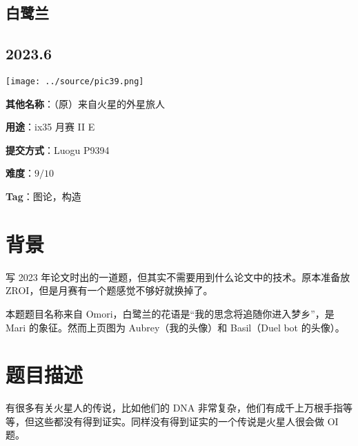 \documentclass[a4paper,10pt]{article}
\begin{document}
\vspace*{\fill}
\begin{center}

\section{白鹭兰}

\subsection*{2023.6}

\vspace{10pt}

\texttt{[image: ../source/pic39.png]}

\vspace{10pt}

\textbf{其他名称}：（原）来自火星的外星旅人

\vspace{10pt}

\textbf{用途}：ix35 月赛 II E

\vspace{10pt}

\textbf{提交方式}：Luogu P9394

\vspace{10pt}

\textbf{难度}：$9/10$

\vspace{10pt}

\textbf{Tag}：图论，构造

\end{center}
\vspace*{\fill}

\newpage

\section*{背景}

写 2023 年论文时出的一道题，但其实不需要用到什么论文中的技术。原本准备放 ZROI，但是月赛有一个题感觉不够好就换掉了。

本题题目名称来自 Omori，白鹭兰的花语是“我的思念将追随你进入梦乡”，是 Mari 的象征。然而上页图为 Aubrey（我的头像）和 Basil（Duel bot 的头像）。

\section*{题目描述}

有很多有关火星人的传说，比如他们的 DNA 非常复杂，他们有成千上万根手指等等，但这些都没有得到证实。同样没有得到证实的一个传说是火星人很会做 OI 题。
\end{document}
